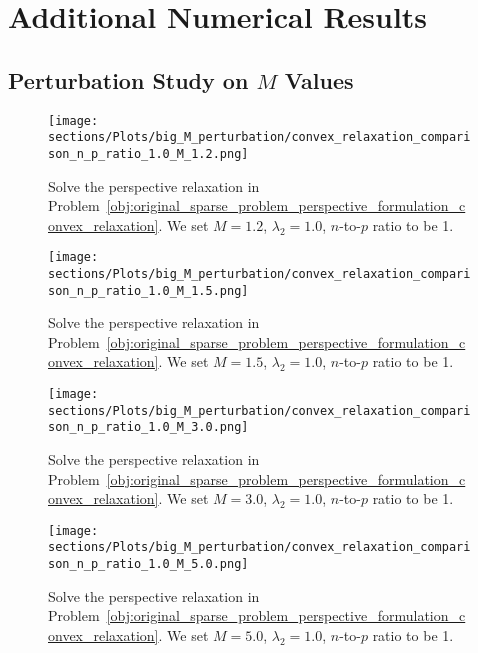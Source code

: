 \section{Additional Numerical Results}
\label{appendix:numerical}
\subsection{Perturbation Study on $M$ Values}

\begin{figure*}[h]
    \texttt{[image: sections/Plots/big\_M\_perturbation/convex\_relaxation\_comparison\_n\_p\_ratio\_1.0\_M\_1.2.png]}
    \caption{Solve the perspective relaxation in Problem~\eqref{obj:original_sparse_problem_perspective_formulation_convex_relaxation}.
    We set $M=1.2$, $\lambda_2=1.0$, $n$-to-$p$ ratio to be 1.}
    \label{fig:solve_convex_relaxation_M_1.2_lambda2_1.0_n_p_ratio_1.0}
\end{figure*}

\begin{figure*}[h]
    \texttt{[image: sections/Plots/big\_M\_perturbation/convex\_relaxation\_comparison\_n\_p\_ratio\_1.0\_M\_1.5.png]}
    \caption{Solve the perspective relaxation in Problem~\eqref{obj:original_sparse_problem_perspective_formulation_convex_relaxation}.
    We set $M=1.5$, $\lambda_2=1.0$, $n$-to-$p$ ratio to be 1.}
    \label{fig:solve_convex_relaxation_M_1.5_lambda2_1.0_n_p_ratio_1.0}
\end{figure*}

\begin{figure*}
    \texttt{[image: sections/Plots/big\_M\_perturbation/convex\_relaxation\_comparison\_n\_p\_ratio\_1.0\_M\_3.0.png]}
    \caption{Solve the perspective relaxation in Problem~\eqref{obj:original_sparse_problem_perspective_formulation_convex_relaxation}.
    We set $M=3.0$, $\lambda_2=1.0$, $n$-to-$p$ ratio to be 1.}
    \label{fig:solve_convex_relaxation_M_3.0_lambda2_1.0_n_p_ratio_1.0}
\end{figure*}

\begin{figure*}
    \texttt{[image: sections/Plots/big\_M\_perturbation/convex\_relaxation\_comparison\_n\_p\_ratio\_1.0\_M\_5.0.png]}
    \caption{Solve the perspective relaxation in Problem~\eqref{obj:original_sparse_problem_perspective_formulation_convex_relaxation}.
    We set $M=5.0$, $\lambda_2=1.0$, $n$-to-$p$ ratio to be 1.}
    \label{fig:solve_convex_relaxation_M_5.0_lambda2_1.0_n_p_ratio_1.0}
\end{figure*}

